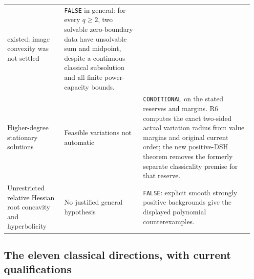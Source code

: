 \documentclass[11pt,a4paper]{article}
\numberwithin{equation}{section}
\theoremstyle{definition}
\theoremstyle{remark}
\begin{document}
\begin{longtable}{@{}p{}p{}p{}@{}}
existed; image convexity was not settled & \texttt{FALSE} in general:
for every $q\ge2$, two solvable zero-boundary data have unsolvable sum
and midpoint, despite a continuous classical subsolution and all finite
power-capacity bounds.\\[4pt]
Higher-degree stationary solutions & Feasible variations not
automatic & \texttt{CONDITIONAL} on the stated reserves and margins.
R6 computes the exact two-sided actual variation radius from value
margins and original current order; the new positive-DSH theorem
removes the formerly separate classicality premise for that reserve.\\[4pt]
Unrestricted relative Hessian root concavity and hyperbolicity &
No justified general hypothesis & \texttt{FALSE}: explicit smooth
strongly positive backgrounds give the displayed polynomial
counterexamples.\\
\bottomrule
\end{longtable}
\endgroup

\subsection{The eleven classical directions, with current qualifications}
\end{document}
